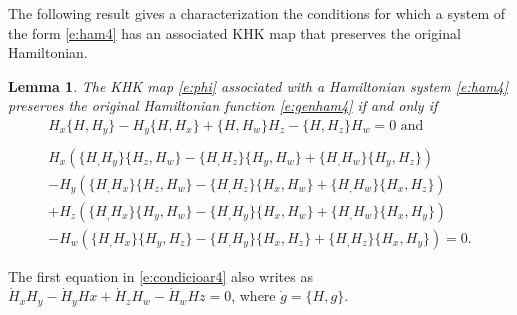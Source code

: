 \documentclass[11pt]{article}
\newtheorem {lemma}  [theorem]{Lemma}
\begin{document}
The following result gives a characterization the conditions for which a system of the form \eqref{e:ham4} has an associated KHK map that preserves the original Hamiltonian.

\begin{lemma}\label{l:invr4}
The KHK map \eqref{e:phi} associated with a  Hamiltonian system \eqref{e:ham4} preserves the original Hamiltonian function \eqref{e:genham4} if and only if
\begin{equation}\label{e:condicioar4}
\begin{array}{l}
H_x\{H,H_y\}-H_y\{H,H_x\}+\{H,H_w\}H_z-\{H,H_z\}H_w=0 \mbox{ and}\\
\\
H_x\left(\{H_,H_y\}\{H_z,H_w\}-\{H_,H_z\}\{H_y,H_w\}+\{H_,H_w\}\{H_y,H_z\}\right)\\
-H_y\left(\{H_,H_x\}\{H_z,H_w\}-\{H_,H_z\}\{H_x,H_w\}+\{H_,H_w\}\{H_x,H_z\}\right)\\
+H_z\left(\{H_,H_x\}\{H_y,H_w\}-\{H_,H_y\}\{H_x,H_w\}+\{H_,H_w\}\{H_x,H_y\}\right)\\
-H_w\left(\{H_,H_x\}\{H_y,H_z\}-\{H_,H_y\}\{H_x,H_z\}+\{H_,H_z\}\{H_x,H_y\}\right)=0.
\end{array}
\end{equation}
 \end{lemma}


The first equation in \eqref{e:condicioar4} also writes as
$ \dot{H}_xH_y-\dot{H}_yHx+\dot{H}_zH_w-\dot{H}_wHz=0$, where  $\dot{g}=\{H,g\}$.
\end{document}
